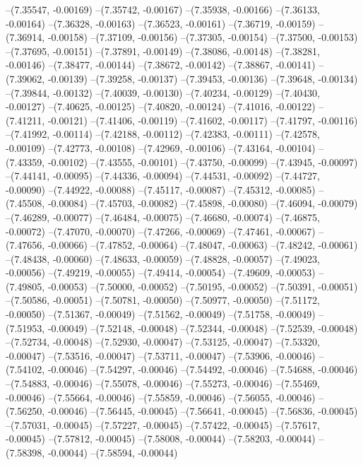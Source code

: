 --(7.35547, -0.00169)
--(7.35742, -0.00167)
--(7.35938, -0.00166)
--(7.36133, -0.00164)
--(7.36328, -0.00163)
--(7.36523, -0.00161)
--(7.36719, -0.00159)
--(7.36914, -0.00158)
--(7.37109, -0.00156)
--(7.37305, -0.00154)
--(7.37500, -0.00153)
--(7.37695, -0.00151)
--(7.37891, -0.00149)
--(7.38086, -0.00148)
--(7.38281, -0.00146)
--(7.38477, -0.00144)
--(7.38672, -0.00142)
--(7.38867, -0.00141)
--(7.39062, -0.00139)
--(7.39258, -0.00137)
--(7.39453, -0.00136)
--(7.39648, -0.00134)
--(7.39844, -0.00132)
--(7.40039, -0.00130)
--(7.40234, -0.00129)
--(7.40430, -0.00127)
--(7.40625, -0.00125)
--(7.40820, -0.00124)
--(7.41016, -0.00122)
--(7.41211, -0.00121)
--(7.41406, -0.00119)
--(7.41602, -0.00117)
--(7.41797, -0.00116)
--(7.41992, -0.00114)
--(7.42188, -0.00112)
--(7.42383, -0.00111)
--(7.42578, -0.00109)
--(7.42773, -0.00108)
--(7.42969, -0.00106)
--(7.43164, -0.00104)
--(7.43359, -0.00102)
--(7.43555, -0.00101)
--(7.43750, -0.00099)
--(7.43945, -0.00097)
--(7.44141, -0.00095)
--(7.44336, -0.00094)
--(7.44531, -0.00092)
--(7.44727, -0.00090)
--(7.44922, -0.00088)
--(7.45117, -0.00087)
--(7.45312, -0.00085)
--(7.45508, -0.00084)
--(7.45703, -0.00082)
--(7.45898, -0.00080)
--(7.46094, -0.00079)
--(7.46289, -0.00077)
--(7.46484, -0.00075)
--(7.46680, -0.00074)
--(7.46875, -0.00072)
--(7.47070, -0.00070)
--(7.47266, -0.00069)
--(7.47461, -0.00067)
--(7.47656, -0.00066)
--(7.47852, -0.00064)
--(7.48047, -0.00063)
--(7.48242, -0.00061)
--(7.48438, -0.00060)
--(7.48633, -0.00059)
--(7.48828, -0.00057)
--(7.49023, -0.00056)
--(7.49219, -0.00055)
--(7.49414, -0.00054)
--(7.49609, -0.00053)
--(7.49805, -0.00053)
--(7.50000, -0.00052)
--(7.50195, -0.00052)
--(7.50391, -0.00051)
--(7.50586, -0.00051)
--(7.50781, -0.00050)
--(7.50977, -0.00050)
--(7.51172, -0.00050)
--(7.51367, -0.00049)
--(7.51562, -0.00049)
--(7.51758, -0.00049)
--(7.51953, -0.00049)
--(7.52148, -0.00048)
--(7.52344, -0.00048)
--(7.52539, -0.00048)
--(7.52734, -0.00048)
--(7.52930, -0.00047)
--(7.53125, -0.00047)
--(7.53320, -0.00047)
--(7.53516, -0.00047)
--(7.53711, -0.00047)
--(7.53906, -0.00046)
--(7.54102, -0.00046)
--(7.54297, -0.00046)
--(7.54492, -0.00046)
--(7.54688, -0.00046)
--(7.54883, -0.00046)
--(7.55078, -0.00046)
--(7.55273, -0.00046)
--(7.55469, -0.00046)
--(7.55664, -0.00046)
--(7.55859, -0.00046)
--(7.56055, -0.00046)
--(7.56250, -0.00046)
--(7.56445, -0.00045)
--(7.56641, -0.00045)
--(7.56836, -0.00045)
--(7.57031, -0.00045)
--(7.57227, -0.00045)
--(7.57422, -0.00045)
--(7.57617, -0.00045)
--(7.57812, -0.00045)
--(7.58008, -0.00044)
--(7.58203, -0.00044)
--(7.58398, -0.00044)
--(7.58594, -0.00044)
